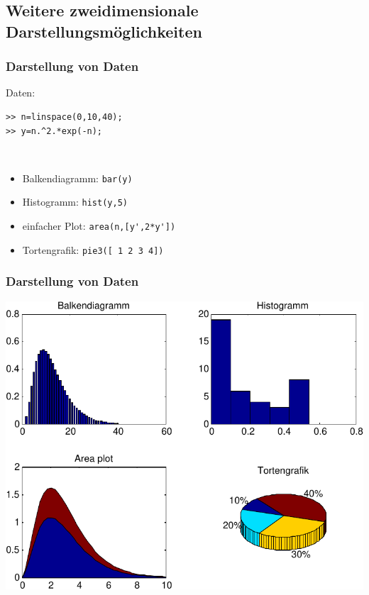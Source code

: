 \subsection{Weitere zweidimensionale Darstellungsmöglichkeiten}

% 
% 
\begin{frame}[fragile]\frametitle{Darstellung von Daten}
\begin{minipage}{3cm}
Daten: 
\end{minipage}
\begin{minipage}{7cm}
\begin{lstlisting}
>> n=linspace(0,10,40);
>> y=n.^2.*exp(-n);
\end{lstlisting}
\end{minipage}\\
\begin{itemize}
\item Balkendiagramm: \alert{ \lstinline!bar(y)!}
\item Histogramm: \alert{ \lstinline!hist(y,5)!}
\item einfacher Plot: \alert{ \lstinline!area(n,[y',2*y'])!}
\item Tortengrafik:  \alert{ \lstinline!pie3([ 1 2 3 4])!}
\end{itemize}
\end{frame}
% 
% 
\begin{frame}[fragile]\frametitle{Darstellung von Daten}
\begin{center}\includegraphics[height=0.8\textheight]{./figures/darstellung_daten_2d}\end{center}
\end{frame}
